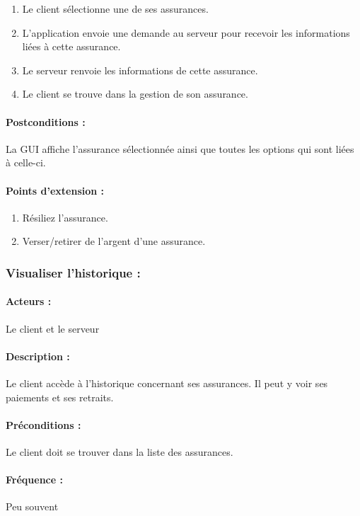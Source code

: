 \documentclass[../annexe.tex]{subfiles}
\begin{document}
	\begin{enumerate}
		\item Le client sélectionne une de ses assurances.
		\item L'application envoie une demande au serveur pour recevoir les informations liées à cette assurance.
		\item Le serveur renvoie les informations de cette assurance.
		\item Le client se trouve dans la gestion de son assurance.
	\end{enumerate}

\paragraph{Postconditions :} La GUI affiche l'assurance sélectionnée ainsi que toutes les options qui sont liées à celle-ci.

\paragraph{Points d'extension :}
		\begin{enumerate}
				\item Résiliez l'assurance.
				\item Verser/retirer de l'argent d'une assurance.
		\end{enumerate}
\newpage

\subsubsection{Visualiser l'historique :}

\paragraph{Acteurs :} Le client et le serveur 

\paragraph{Description :} Le client accède à l'historique concernant ses assurances. Il peut y voir ses paiements et ses retraits.

\paragraph{Préconditions :} Le client doit se trouver dans la liste des assurances.

\paragraph{Fréquence :} Peu souvent 
\end{document}
